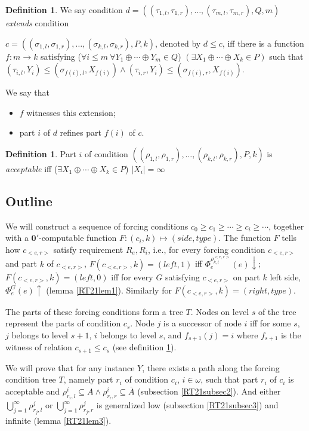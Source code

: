 \documentclass[options]{amsart}
\theoremstyle{definition}
\newtheorem{definition}[theorem]{Definition}
\theoremstyle{remark}
\newtheorem{Ramsey's theorem}[theorem]{Ramsey's theorem}
\begin{document}
  \begin{definition}
\label{extend}
We say condition
$d=((\tau_{1,l},\tau_{1,r}),\ldots,(\tau_{m,l},\tau_{m,r}),Q,
m)$ \emph{extends} condition

$c=((\sigma_{1,l},\sigma_{1,r}),\ldots,(\sigma_{k,l},\sigma_{k,r}),
P,k)$,
denoted by $d\leq c$, iff there is a function $f : m
\rightarrow k$ satisfying
 ($\forall i\leq m\ \forall Y_1 \oplus
\cdots \oplus Y_{m} \in Q$) $(\exists X_1 \oplus \cdots \oplus
X_{k} \in P)$
such that $(\tau_{i,l},Y_i)\leq (\sigma_{f(i),l},X_{f(i)})
\wedge (\tau_{i,r},Y_i)\leq (\sigma_{f(i),r},X_{f(i)})$.

We say that
\begin{itemize}
\item$f$ witnesses this extension;
\item part $i$ of
$d$ refines part $f(i)$ of $c$.
\end{itemize}
\end{definition}

\begin{definition}
Part $i$ of condition
 $((\rho_{1,l},\rho_{1,r})
,\ldots,(\rho_{k,l},\rho_{k,r}),P,k)$
 is \emph{acceptable } iff
($\exists X_1
\oplus \cdots \oplus X_{k} \in P$)
 $|X_i|=\infty$
\end{definition}

\subsection{Outline}\label{RT21subsec0}
We will construct a sequence of
forcing conditions $c_0\geq c_1\geq \cdots
\geq c_i\geq \cdots$, together with
a $\mathbf{0}'$-computable function $F:
(c_i, k)\mapsto (side, type)$. The function
$F$ tells how $c_{<e,r>}$ satisfy requirement
$R_e,R_i$, i.e.,
for every forcing condition $c_{<e,r>}$ and part
$k$ of $c_{<e,r>}$, $F(c_{<e,r>},k)=(left, 1)$ iff
$\Phi_e^{\rho^{<e,r>}_{k,l}}(e)\downarrow$;
$F(c_{<e,r>},k)=(left, 0)$ iff
for every $G$ satisfying $c_{<e,r>}$
on part $k$ left side, $\Phi_e^G(e)\uparrow$
(lemma \ref{RT21lem1}).
Similarly for $F(c_{<e,r>},k)=(right, type)$.

The parts of these forcing conditions
form a tree $T$. Nodes on level $s$ of the tree
 represent the parts of condition
$c_s$. Node $j$ is a successor of node $i$ iff
for some $s$, $j$ belongs to level $s+1$,
$i$ belongs to level $s$, and
$f_{s+1}(j)=i$ where $f_{s+1}$
is the witness
of relation $c_{s+1}\leq c_s$
 (see definition \ref{extend}).

We will prove that for any instance
$Y$, there exists a path along the forcing condition
tree $T$, namely part $r_i$ of
condition $c_i$, $i\in\omega$,
such that part $r_i$ of $c_i$ is acceptable
and $\rho^i_{r_i,l}\subseteq A\wedge
\rho^i_{r_i,r}\subseteq\overline{A}$
(subsection \ref{RT21subsec2}).
 And either $\bigcup\limits_{j=1}^\infty
\rho^j_{r_j,l}$ or $\bigcup\limits_{j=1}^\infty
\rho^j_{r_j,r}$ is generalized low
(subsection \ref{RT21subsec3}) and infinite
(lemma \ref{RT21lem3}).
\end{document}

